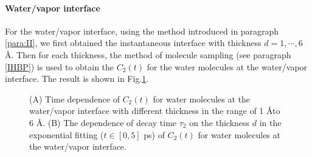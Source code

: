 \paragraph{Water/vapor interface} For the water/vapor interface, using the method introduced in paragraph \ref{para:II}, 
we first obtained the instantaneous interface
with thickness $d=1, \cdots, 6$ \AA. Then for each thickness, the method of molecule sampling (see paragraph \ref{IHBP}) 
is used to obtain the $C_2(t)$ for the water molecules at the water/vapor interface.
The result is shown in Fig.\thinspace\ref{fig:128w_c2_tau2_vs_thickness}.
\begin{figure}[H]%
    \centering
    \qquad
    \caption{
(A) Time dependence of $C_2(t)$ for water molecules at the water/vapor interface with different thickness in the range of 1 \AA to 6 \AA. 
(B) The dependence of decay time $\tau_2$ on the thickness $d$ in the exponential fitting ($t \in [0,5]$ ps) of $C_2(t)$ for water molecules at the water/vapor interface.
}%
    \label{fig:128w_c2_tau2_vs_thickness}%
\end{figure}

